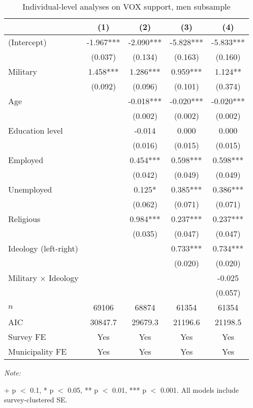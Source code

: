\begin{table}[!h]

\caption{Individual-level analyses on VOX support, men subsample\label{tab:survey_glm_full_men}}
\centering
\begin{threeparttable}
\begin{tabular}[t]{lcccc}
\toprule
  & (1) & (2) & (3) & (4)\\
\midrule
(Intercept) & -1.967*** & -2.090*** & -5.828*** & -5.833***\\
 & (0.037) & (0.134) & (0.163) & (0.160)\\
Military & 1.458*** & 1.286*** & 0.959*** & 1.124**\\
 & (0.092) & (0.096) & (0.101) & (0.374)\\
Age &  & -0.018*** & -0.020*** & -0.020***\\
 &  & (0.002) & (0.002) & (0.002)\\
Education level &  & -0.014 & 0.000 & 0.000\\
 &  & (0.016) & (0.015) & (0.015)\\
Employed &  & 0.454*** & 0.598*** & 0.598***\\
 &  & (0.042) & (0.049) & (0.049)\\
Unemployed &  & 0.125* & 0.385*** & 0.386***\\
 &  & (0.062) & (0.071) & (0.071)\\
Religious &  & 0.984*** & 0.237*** & 0.237***\\
 &  & (0.035) & (0.047) & (0.047)\\
Ideology (left-right) &  &  & 0.733*** & 0.734***\\
 &  &  & (0.020) & (0.020)\\
Military $\times$ Ideology &  &  &  & -0.025\\
 &  &  &  & (0.057)\\
\midrule
$n$ & 69106 & 68874 & 61354 & 61354\\
AIC & 30847.7 & 29679.3 & 21196.6 & 21198.5\\
Survey FE & Yes & Yes & Yes & Yes\\
Municipality FE & Yes & Yes & Yes & Yes\\
\bottomrule
\end{tabular}
\begin{tablenotes}[para]
\item \textit{Note: } 
\item + p $<$ 0.1, * p $<$ 0.05, ** p $<$ 0.01, *** p $<$ 0.001. All models include survey-clustered SE.
\end{tablenotes}
\end{threeparttable}
\end{table}
